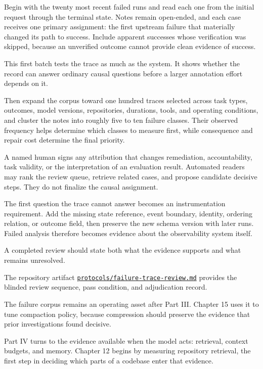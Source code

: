 Begin with the twenty most recent failed runs and read each one from the initial request through the terminal state. Notes remain open-ended, and each case receives one primary assignment: the first upstream failure that materially changed its path to success. Include apparent successes whose verification was skipped, because an unverified outcome cannot provide clean evidence of success.

This first batch tests the trace as much as the system. It shows whether the record can answer ordinary causal questions before a larger annotation effort depends on it.

Then expand the corpus toward one hundred traces selected across task types, outcomes, model versions, repositories, durations, tools, and operating conditions, and cluster the notes into roughly five to ten failure classes. Their observed frequency helps determine which classes to measure first, while consequence and repair cost determine the final priority.

A named human signs any attribution that changes remediation, accountability, task validity, or the interpretation of an evaluation result. Automated readers may rank the review queue, retrieve related cases, and propose candidate decisive steps. They do not finalize the causal assignment.

The first question the trace cannot answer becomes an instrumentation requirement. Add the missing state reference, event boundary, identity, ordering relation, or outcome field, then preserve the new schema version with later runs. Failed analysis therefore becomes evidence about the observability system itself.

A completed review should state both what the evidence supports and what remains unresolved.

The repository artifact \href{https://github.com/sjarmak/engineering-reliable-coding-agents/blob/main/protocols/failure-trace-review.md}{\texttt{protocols/failure-trace-review.md}} provides the blinded review sequence, pass condition, and adjudication record.

The failure corpus remains an operating asset after Part III. Chapter 15 uses it to tune compaction policy, because compression should preserve the evidence that prior investigations found decisive.

Part IV turns to the evidence available when the model acts: retrieval, context budgets, and memory. Chapter 12 begins by measuring repository retrieval, the first step in deciding which parts of a codebase enter that evidence.

